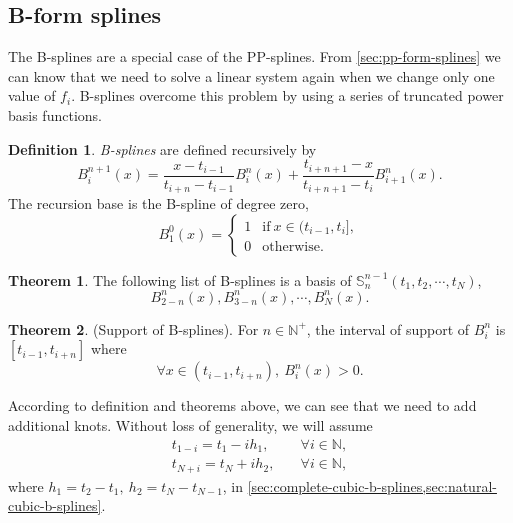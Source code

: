 \documentclass[a4paper]{article}
\theoremstyle{definition}
\newtheorem{definition}{Definition}
\newtheorem{theorem}{Theorem}
\begin{document}
\subsection{B-form splines}

The B-splines are a special case of the PP-splines. From \cref{sec:pp-form-splines} we can know that we need to solve a linear system again when we change only one value of $f_i$. B-splines overcome this problem by using a series of truncated power basis functions.

\begin{definition}
  \textit{B-splines} are defined recursively by 
  \begin{equation}
    B_i^{n + 1}(x) = \frac{x - t_{i- 1}}{t_{i + n} - t_{i - 1}}B_i^n(x) + \frac{t_{i + n + 1} - x}{t_{i + n + 1} - t_i}B_{i + 1}^n(x).
    \label{eq:b-spline-recursive}
  \end{equation}
  The recursion base is the B-spline of degree zero,
  \begin{equation}
    B_1^0(x) = \begin{cases}
      1 & \text{if}\ x \in (t_{i - 1}, t_i], \\
      0 & \text{otherwise}.
    \end{cases}
  \end{equation}
\end{definition}

\begin{theorem}
  The following list of B-splines is a basis of $\mathbb{S}_n^{n - 1}(t_1, t_2, \cdots, t_N)$,
  \begin{equation}
    B_{2 - n}^n(x), B_{3 - n}^n(x), \cdots, B_{N}^n(x).
    \label{eq:b-spline-basis}
  \end{equation}
\end{theorem}

\begin{theorem}
  (Support of B-splines). For $n \in \mathbb{N}^+$, the interval of support of $B_i^n$ is $[t_{i - 1}, t_{i + n}]$ where 
  \begin{equation}
    \forall x \in (t_{i - 1}, t_{i + n}),\ B_i^n(x) > 0.
    \label{eq:b-spline-support}
  \end{equation}
  \label{thm:b-spline-support}
\end{theorem}

According to definition and theorems above, we can see that we need to add additional knots. Without loss of generality, we will assume 
\begin{equation}
  \begin{aligned}
    t_{1 - i} = t_1 - ih_1,& \quad \forall i \in \mathbb{N}, \\
    t_{N + i} = t_N + ih_2,& \quad \forall i \in \mathbb{N},
  \end{aligned}
  \label{eq:cubic-b-spline-knots}
\end{equation}
where $h_1 = t_2 - t_1,\ h_2 = t_N - t_{N - 1}$, in \cref{sec:complete-cubic-b-splines,sec:natural-cubic-b-splines}.
\end{document}
